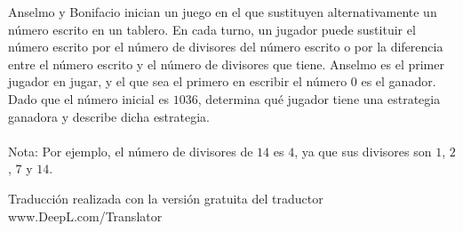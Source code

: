 Anselmo y Bonifacio inician un juego en el que sustituyen alternativamente un número escrito en un tablero. En cada turno, un jugador puede sustituir el número escrito por el número de divisores del número escrito o por la diferencia entre el número escrito y el número de divisores que tiene. Anselmo es el primer jugador en jugar, y el que sea el primero en escribir el número $0$ es el ganador. Dado que el número inicial es $1036$, determina qué jugador tiene una estrategia ganadora y describe dicha estrategia. \\\\
Nota: Por ejemplo, el número de divisores de $14$ es $4$, ya que sus divisores son $1$, $2$, $7$ y $14$.

Traducción realizada con la versión gratuita del traductor www.DeepL.com/Translator
